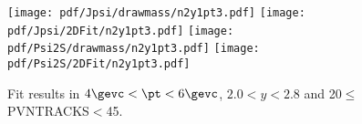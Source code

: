 \begin{figure}[H]
\begin{center}
\texttt{[image: pdf/Jpsi/drawmass/n2y1pt3.pdf]}
\texttt{[image: pdf/Jpsi/2DFit/n2y1pt3.pdf]}
\vspace*{-0.5cm}
\texttt{[image: pdf/Psi2S/drawmass/n2y1pt3.pdf]}
\texttt{[image: pdf/Psi2S/2DFit/n2y1pt3.pdf]}
\vspace*{-0.5cm}
\end{center}
\caption{Fit results in $4\gevc<\pt<6\gevc$, $2.0<y<2.8$ and 20$\leq$PVNTRACKS$<$45.}
\label{Fitn2y1pt3}
\end{figure}
